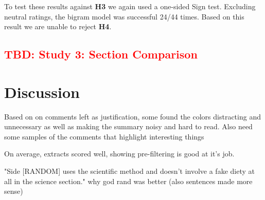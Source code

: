       To test these results against \textbf{H3} we again used a one-sided Sign test. Excluding neutral ratings, the bigram model was successful 24/44 times. Based on this result we are unable to reject \textbf{H4}.

    \subsection{\textcolor{red}{TBD: Study 3: Section Comparison}}

  \section{Discussion}
    Based on on comments left as justification, some found the colors distracting and unnecessary as well as making the summary noisy and hard to read.
    Also need some samples of the comments that highlight interesting things

    On average, extracts scored well, showing pre-filtering is good at it's job.


    "Side [RANDOM] uses the scientific method and doesn't involve a fake diety at all in the science section." why god rand was better (also sentences made more sense)
